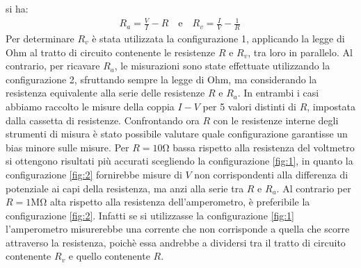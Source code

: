 \documentclass[a4paper]{article}
\begin{document}
si ha:
\begin{align}
	 & R_a = \frac {V}{I} - R \quad \text{e} \quad R_v = \frac {I}{V} - \frac{1}{R}\quad \label{eq:1}
\end{align}
Per determinare \( \mathit{R_v} \) è stata utilizzata la configurazione 1,
applicando la legge di Ohm al tratto di circuito contenente le resistenze \( \mathit{R} \) e \( \mathit{R_v} \), tra loro in parallelo.
Al contrario, per ricavare \( \mathit{R_a} \), le misurazioni sono state effettuate utilizzando la configurazione 2,
sfruttando sempre la legge di Ohm, ma considerando la resistenza equivalente alla serie delle resistenze \( \mathit{R} \) e \( \mathit{R_a} \).
In entrambi i casi abbiamo raccolto le misure della coppia \( \mathit{I-V} \) per 5 valori distinti di \( \mathit{R} \), impostata dalla cassetta di resistenze.
Confrontando ora \(R\) con le resistenze interne degli strumenti di misura è stato possibile valutare quale configurazione garantisse un bias minore sulle misure.
Per \(R = 10\si{\ohm}\) bassa rispetto alla resistenza del voltmetro si ottengono risultati più accurati scegliendo la configurazione \ref{fig:1}, in quanto la configurazione \ref{fig:2}
fornirebbe misure di \( V \) non corrispondenti alla differenza di potenziale ai capi della resistenza, ma anzi alla serie tra \(R\) e \(R_a\).
Al contrario per \(R=1\si{\mega\ohm}\) alta rispetto alla resistenza dell'amperometro, è preferibile la configurazione \ref{fig:2}.
Infatti se si utilizzasse la configurazione \ref{fig:1} l'amperometro misurerebbe una corrente che non corrisponde a quella che scorre attraverso la resistenza, poichè essa andrebbe a dividersi tra il tratto di circuito contenente \(R_v\) e quello contenente \(R\).
\end{document}
